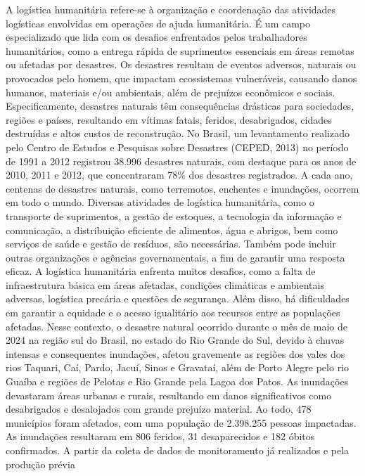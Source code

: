 \documentclass[
]{article}
\begin{document}
\begin{enumerate}
  A logística humanitária refere-se à organização e coordenação das
  atividades logísticas envolvidas em operações de ajuda humanitária. É
  um campo especializado que lida com os desafios enfrentados pelos
  trabalhadores humanitários, como a entrega rápida de suprimentos
  essenciais em áreas remotas ou afetadas por desastres. Os desastres
  resultam de eventos adversos, naturais ou provocados pelo homem, que
  impactam ecossistemas vulneráveis, causando danos humanos, materiais
  e/ou ambientais, além de prejuízos econômicos e sociais.
  Especificamente, desastres naturais têm consequências drásticas para
  sociedades, regiões e países, resultando em vítimas fatais, feridos,
  desabrigados, cidades destruídas e altos custos de reconstrução. No
  Brasil, um levantamento realizado pelo Centro de Estudos e Pesquisas
  sobre Desastres (CEPED, 2013) no período de 1991 a 2012 registrou
  38.996 desastres naturais, com destaque para os anos de 2010, 2011 e
  2012, que concentraram 78\% dos desastres registrados. A cada ano,
  centenas de desastres naturais, como terremotos, enchentes e
  inundações, ocorrem em todo o mundo. Diversas atividades de logística
  humanitária, como o transporte de suprimentos, a gestão de estoques, a
  tecnologia da informação e comunicação, a distribuição eficiente de
  alimentos, água e abrigos, bem como serviços de saúde e gestão de
  resíduos, são necessárias. Também pode incluir outras organizações e
  agências governamentais, a fim de garantir uma resposta eficaz. A
  logística humanitária enfrenta muitos desafios, como a falta de
  infraestrutura básica em áreas afetadas, condições climáticas e
  ambientais adversas, logística precária e questões de segurança. Além
  disso, há dificuldades em garantir a equidade e o acesso igualitário
  aos recursos entre as populações afetadas. Nesse contexto, o desastre
  natural ocorrido durante o mês de maio de 2024 na região sul do
  Brasil, no estado do Rio Grande do Sul, devido à chuvas intensas e
  consequentes inundações, afetou gravemente as regiões dos vales dos
  rios Taquari, Caí, Pardo, Jacuí, Sinos e Gravataí, além de Porto
  Alegre pelo rio Guaíba e regiões de Pelotas e Rio Grande pela Lagoa
  dos Patos. As inundações devastaram áreas urbanas e rurais, resultando
  em danos significativos como desabrigados e desalojados com grande
  prejuízo material. Ao todo, 478 municípios foram afetados, com uma
  população de 2.398.255 pessoas impactadas. As inundações resultaram em
  806 feridos, 31 desaparecidos e 182 óbitos confirmados. A partir da
  coleta de dados de monitoramento já realizados e pela produção prévia

\end{enumerate}
\end{document}
